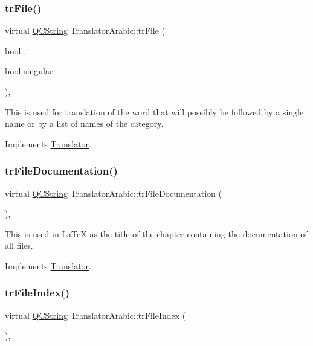 \subsubsection{\texorpdfstring{trFile()}{trFile()}}
{\footnotesize\ttfamily virtual \mbox{\hyperlink{class_q_c_string}{Q\+C\+String}} Translator\+Arabic\+::tr\+File (\begin{DoxyParamCaption}\item[{bool}]{,  }\item[{bool}]{singular }\end{DoxyParamCaption})\hspace{0.3cm}{\ttfamily [inline]}, {\ttfamily [virtual]}}

This is used for translation of the word that will possibly be followed by a single name or by a list of names of the category. 

Implements \mbox{\hyperlink{class_translator}{Translator}}.

\mbox{\label{class_translator_arabic_a8570fc7161fa78fa6304be53346908cb}} 
\subsubsection{\texorpdfstring{trFileDocumentation()}{trFileDocumentation()}}
{\footnotesize\ttfamily virtual \mbox{\hyperlink{class_q_c_string}{Q\+C\+String}} Translator\+Arabic\+::tr\+File\+Documentation (\begin{DoxyParamCaption}{ }\end{DoxyParamCaption})\hspace{0.3cm}{\ttfamily [inline]}, {\ttfamily [virtual]}}

This is used in La\+TeX as the title of the chapter containing the documentation of all files. 

Implements \mbox{\hyperlink{class_translator}{Translator}}.

\mbox{\label{class_translator_arabic_a9679911e97d493f2c83d0de23f623922}} 
\subsubsection{\texorpdfstring{trFileIndex()}{trFileIndex()}}
{\footnotesize\ttfamily virtual \mbox{\hyperlink{class_q_c_string}{Q\+C\+String}} Translator\+Arabic\+::tr\+File\+Index (\begin{DoxyParamCaption}{ }\end{DoxyParamCaption})\hspace{0.3cm}{\ttfamily [inline]}, {\ttfamily [virtual]}}

